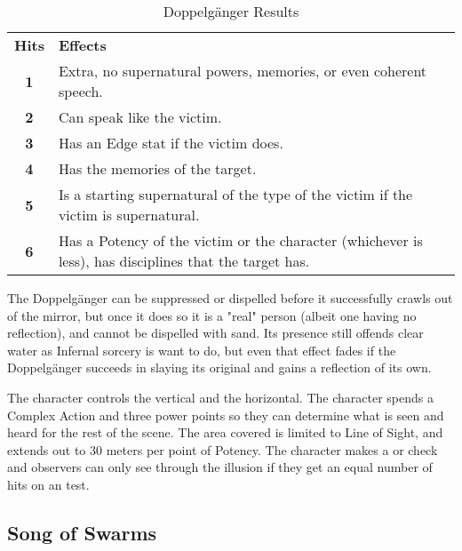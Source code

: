\begin{table}[htb]
 \caption{Doppelg\"{a}nger Results} \centering
\begin{tabular}{c p{14cm}}
\textbf{Hits} & \textbf{Effects}\\
\textbf{1} & Extra, no supernatural powers, memories, or even coherent speech.\\
\textbf{2} & Can speak like the victim.\\
\textbf{3} & Has an Edge stat if the victim does.\\
\textbf{4} & Has the memories of the target.\\
\textbf{5} & Is a starting supernatural of the type of the victim if the victim is supernatural.\\
\textbf{6} & Has a Potency of the victim or the character (whichever is less), has disciplines that the target has.\\
\end{tabular}
\end{table}

The Doppelg\"{a}nger can be suppressed or dispelled before it successfully crawls out of the mirror, but once it does so it is a "real" person (albeit one having no reflection), and cannot be dispelled with sand. Its presence still offends clear water as Infernal sorcery is want to do, but even that effect fades if the Doppelg\"{a}nger succeeds in slaying its original and gains a reflection of its own.

 The character controls the vertical and the horizontal. The character spends a Complex Action and three power points so they can determine what is seen and heard for the rest of the scene. The area covered is limited to Line of Sight, and extends out to 30 meters per point of Potency. The character makes a  or  check and observers can only see through the illusion if they get an equal number of hits on an  test.



\subsection{Song of Swarms}

